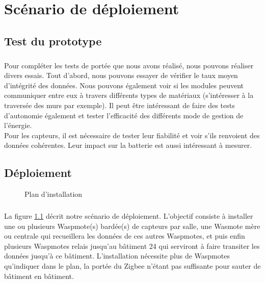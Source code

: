 \chapter{Scénario de déploiement}
\label{sec:deploiement}

\section{Test du prototype}
    \paragraph{} Pour compléter les tests de portée que nous avons réalisé, nous pouvons réaliser divers essais. Tout d'abord, nous pouvons essayer de vérifier le taux moyen d'intégrité des données. Nous pouvons également voir si les modules peuvent communiquer entre eux à travers différents types de matériaux (s'intéresser à la traversée des murs par exemple). Il peut être intéressant de faire des tests d'autonomie également et tester l'efficacité des différents mode de gestion de l'énergie.\\
    Pour les capteurs, il est nécessaire de tester leur fiabilité et voir s'ils renvoient des données cohérentes. Leur impact sur la batterie est aussi intéressant à mesurer.



\section{Déploiement}
    \begin{figure}[h]
        \centering
        
        \caption{Plan d'installation}
        \label{fig:install}
    \end{figure}

    \paragraph{} La figure \ref{fig:install} décrit notre scénario de déploiement. L'objectif consiste à installer une ou plusieurs Waspmote(s) bardée(s) de capteurs par salle, une Wasmote mère ou centrale qui recueillera les données de ces autres Waspmotes, et puis enfin plusieurs Waspmotes relais jusqu'au bâtiment 24 qui serviront à faire transiter les données jusqu'à ce bâtiment. L'installation nécessite plus de Waspmotes qu'indiquer dans le plan, la portée du Zigbee n'étant pas suffisante pour sauter de bâtiment en bâtiment. 
    
